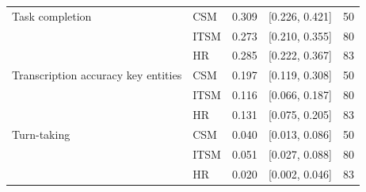 \begin{longtable}{>{\raggedright\arraybackslash}p{1.8cm}lrrr}
\midrule
Task completion & CSM & 0.309 & [0.226, 0.421] & 50 \\
 & ITSM & 0.273 & [0.210, 0.355] & 80 \\
 & HR & 0.285 & [0.222, 0.367] & 83 \\
\midrule
Transcription accuracy key entities & CSM & 0.197 & [0.119, 0.308] & 50 \\
 & ITSM & 0.116 & [0.066, 0.187] & 80 \\
 & HR & 0.131 & [0.075, 0.205] & 83 \\
\midrule
Turn-taking & CSM & 0.040 & [0.013, 0.086] & 50 \\
 & ITSM & 0.051 & [0.027, 0.088] & 80 \\
 & HR & 0.020 & [0.002, 0.046] & 83 \\
\end{longtable}
\endgroup